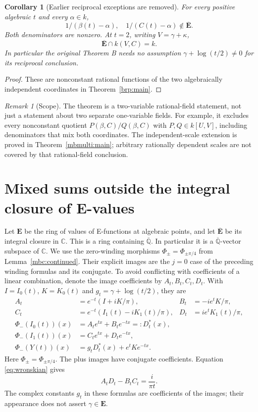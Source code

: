\documentclass[11pt]{article}
\newtheorem{corollary}[theorem]{Corollary}
\theoremstyle{definition}
\theoremstyle{remark}
\newtheorem{remark}[theorem]{Remark}
\newcommand{\Qa}{\overline{\mathbb Q}}
\newcommand{\E}{\mathbf E}
\newcommand{\Ebar}{\overline{\mathbf E}}
\begin{document}
\begin{corollary}[Earlier reciprocal exceptions are removed]
For every positive algebraic $t$ and every $\alpha\in k$,
\[
 1/(\beta(t)-\alpha),\quad 1/(C(t)-\alpha)\notin\Ebar.
\]
Both denominators are nonzero. At $t=2$, writing $V=\gamma+\kappa$,
\[
 \Ebar\cap k(V,C)=k.
\]
In particular the original Theorem B needs no assumption
$\gamma+\log(t/2)\ne0$ for its reciprocal conclusion.
\end{corollary}
\begin{proof}
These are nonconstant rational functions of the two algebraically
independent coordinates in Theorem~\ref{brp:main}.
\end{proof}

\begin{remark}[Scope]
The theorem is a two-variable rational-field statement, not just a
statement about two separate one-variable fields.  For example, it
excludes every nonconstant quotient $P(\beta,C)/Q(\beta,C)$ with
$P,Q\in k[U,V]$, including denominators that mix both coordinates.
The independent-scale extension is proved in
Theorem~\ref{mbmulti:main}; arbitrary rationally dependent scales
are not covered by that rational-field conclusion.
\end{remark}


\section{Mixed sums outside the integral closure of E-values}
Let $\E$ be the ring of values of E-functions at algebraic points, and
let $\Ebar$ be its integral closure in $\mathbb C$. This is a ring containing
$\Qa$. In particular it is a $\Qa$-vector subspace of $\mathbb C$.
We use the zero-winding morphisms $\Phi_\pm=\Phi_{\pm\pi/4}$
from Lemma~\ref{mbc:continued}.  Their explicit images are the
$j=0$ case of the preceding winding formulas and its conjugate.
To avoid conflicting with
coefficients of a linear combination, denote the image coefficients by
$A_t,B_t,C_t,D_t$. With $I=I_0(t)$, $K=K_0(t)$ and
$g_t=\gamma+\log(t/2)$, they are
\begin{align}
A_t&=e^{-t}(I+iK/\pi),& B_t&=-ie^tK/\pi,\nonumber\\
C_t&=e^{-t}(I_1(t)-iK_1(t)/\pi),&D_t&=ie^tK_1(t)/\pi,\label{intlin:images}\\
\Phi_-(I_0(t))(x)&=A_te^{tx}+B_te^{-tx}=:D_t^*(x),\nonumber\\
\Phi_-(I_1(t))(x)&=C_te^{tx}+D_te^{-tx},\nonumber\\
\Phi_-(Y(t))(x)&=g_tD_t^*(x)+e^tK e^{-tx}.\nonumber
\end{align}
Here $\Phi_\pm=\Phi_{\pm\pi/4}$. The plus images have conjugate
coefficients. Equation \eqref{eq:wronskian} gives
\begin{equation}\label{intlin:det}
A_tD_t-B_tC_t=\frac{i}{\pi t}.
\end{equation}
The complex constants $g_t$ in these formulas are coefficients of the
images; their appearance does not assert $\gamma\in\E$.
\end{document}
